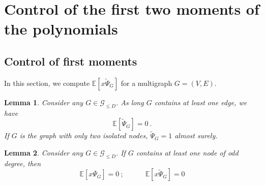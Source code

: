 \documentclass{article}
\newtheorem{lemma}{Lemma}
\begin{document}











%

\section{Control of the first two moments of the polynomials}\label{sec:mom}

\subsection{Control of first moments}

In this section, we compute $\mathbb{E}[x\widetilde{\Psi}_G]$ for a multigraph $G=(V,E)$.


\begin{lemma}\label{lem:first_moment_tilde_psi}
Consider any $G\in \mathcal{G}_{\leq D}$. As long $G$ contains at least one edge, we have
\[
\mathbb{E}\left[\widetilde{\Psi}_G\right] = 0\ . 
\]
If $G$ is the graph with only two isolated nodes, $\widetilde{\Psi}_G= 1$ almost surely. 
\end{lemma}


\begin{lemma}\label{lem:first_moment_degreeuneven}
    Consider any $G\in \mathcal{G}_{\leq D}$.  If $G$ contains at least one node of odd degree, then 
    \[
    \mathbb{E}[x\overline{\Psi}_G]=0 \ ; \quad \quad \quad \mathbb{E}[x\widetilde{\Psi}_G]=0 
    \]
    \end{lemma}
\end{document}
